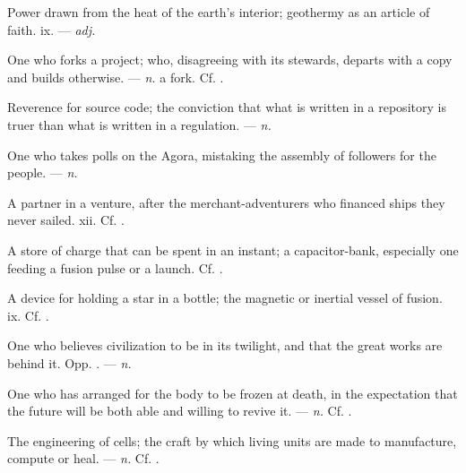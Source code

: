  Power drawn from the heat of the earth's interior; geothermy as an article of faith.   ix. ---  \textit{adj.}

 One who forks a project; who, disagreeing with its stewards, departs with a copy and builds otherwise.  ---  \textit{n.} a fork. Cf. .

 Reverence for source code; the conviction that what is written in a repository is truer than what is written in a regulation. ---  \textit{n.}

 One who takes polls on the Agora, mistaking the assembly of followers for the people. ---  \textit{n.}

 A partner in a venture, after the merchant-adventurers who financed ships they never sailed.   xii. Cf. .

 A store of charge that can be spent in an instant; a capacitor-bank, especially one feeding a fusion pulse or a launch. Cf. .

 A device for holding a star in a bottle; the magnetic or inertial vessel of fusion.   ix. Cf. .

 One who believes civilization to be in its twilight, and that the great works are behind it. Opp. . ---  \textit{n.}

 One who has arranged for the body to be frozen at death, in the expectation that the future will be both able and willing to revive it. ---  \textit{n.} Cf. .

 The engineering of cells; the craft by which living units are made to manufacture, compute or heal.  ---  \textit{n.} Cf. .
